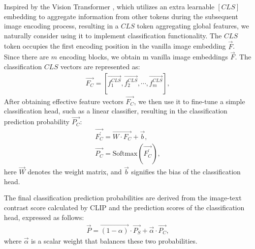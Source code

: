 Inspired by the Vision Transformer \cite{dosovitskiy2020image}, which utilizes an extra learnable $[CLS]$ embedding to aggregate information from other tokens during the subsequent image encoding process, resulting in a $CLS$ token aggregating global features, we naturally consider using it to implement classification functionality. The $CLS$ token occupies the first encoding position in the vanilla image embedding $\vec{F}$. Since there are $m$ encoding blocks, we obtain m vanilla image embeddings $\vec{F}$. The classification $CLS$ vectors are represented as:
\begin{align}
\vec{F_C} = [\vec{f^{CLS}_1}, \vec{f^{CLS}_2}, \cdots, \vec{f^{CLS}_m}],
\end{align}
After obtaining effective feature vectors $\vec{F_C}$, we then use it to fine-tune a simple classification head, such as a linear classifier, resulting in the classification prediction probability $\vec{P_{C}}$:
\begin{align}
\vec{F_{C}^{'}} = \vec{W \cdot F_C} + \vec{b},\\
\vec{P_{C}} = \text{Softmax}(\vec{F_{C}^{'}}),
\end{align}
here $\vec{W}$ denotes the weight matrix, and $\vec{b}$ signifies the bias of the classification head.

The final classification prediction probabilities are derived from the image-text contrast score calculated by CLIP and the prediction scores of the classification head, expressed as follows:
\begin{align}
\vec{P} =\vec{(1-\alpha)} \cdot \vec{P_{S}} + \vec{\alpha} \cdot \vec{P_{C}},
\label{eq:classification}
\end{align}
where $\vec{\alpha}$ is a scalar weight that balances these two probabilities.
